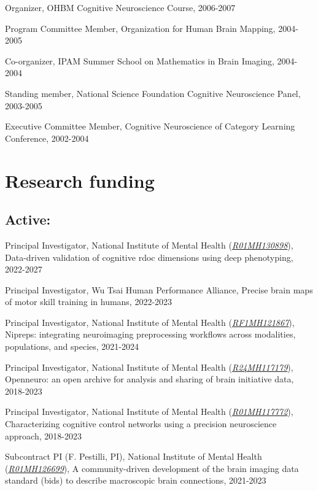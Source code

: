 \documentclass[10pt, letterpaper]{article}
\begin{document}
Organizer, OHBM Cognitive Neuroscience Course, 2006-2007

Program Committee Member, Organization for Human Brain Mapping, 2004-2005

Co-organizer, IPAM Summer School on Mathematics in Brain Imaging, 2004-2004

Standing member, National Science Foundation Cognitive Neuroscience Panel, 2003-2005

Executive Committee Member, Cognitive Neuroscience of Category Learning Conference, 2002-2004


\section*{Research funding}
\noindent

\subsection*{Active:}
Principal Investigator, National Institute of Mental Health (\href{https://reporter.nih.gov/project-details/10515980}{\textit{R01MH130898}}), Data-driven validation of cognitive rdoc dimensions using deep phenotyping, 2022-2027\vspace{2mm}

Principal Investigator, Wu Tsai Human Performance Alliance, Precise brain maps of motor skill training in humans, 2022-2023\vspace{2mm}

Principal Investigator, National Institute of Mental Health (\href{https://reporter.nih.gov/project-details/10260312}{\textit{RF1MH121867}}), Nipreps: integrating neuroimaging preprocessing workflows across modalities, populations, and species, 2021-2024\vspace{2mm}

Principal Investigator, National Institute of Mental Health (\href{http://projectreporter.nih.gov/project_info_description.cfm?aid=9770947}{\textit{R24MH117179}}), Openneuro: an open archive for analysis and sharing of brain initiative data, 2018-2023\vspace{2mm}

Principal Investigator, National Institute of Mental Health (\href{http://projectreporter.nih.gov/project_info_description.cfm?aid=9906911}{\textit{R01MH117772}}), Characterizing cognitive control networks using a precision neuroscience approach, 2018-2023\vspace{2mm}

Subcontract PI (F. Pestilli, PI), National Institute of Mental Health (\href{https://reporter.nih.gov/project-details/10253558}{\textit{R01MH126699}}), A community-driven development of the brain imaging data standard (bids) to describe macroscopic brain connections, 2021-2023\vspace{2mm}
\end{document}
